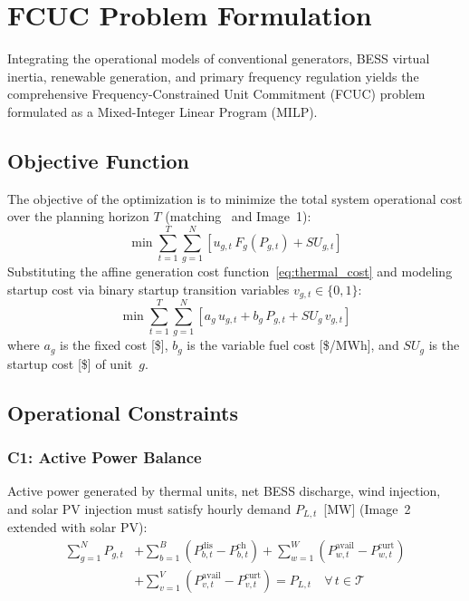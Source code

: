 \documentclass[journal]{IEEEtran}
\begin{document}
\section{FCUC Problem Formulation}
\label{sec:formulation}

Integrating the operational models of conventional generators, BESS virtual inertia, renewable generation, and primary frequency regulation yields the comprehensive Frequency-Constrained Unit Commitment (FCUC) problem formulated as a Mixed-Integer Linear Program (MILP).

\subsection{Objective Function}

The objective of the optimization is to minimize the total system operational cost over the planning horizon $T$ (matching~\cite{E02Sulawesi} and Image~1):
\begin{equation}
  \min \sum_{t=1}^{T} \sum_{g=1}^{N} \left[ u_{g,t}\,F_g(P_{g,t}) + SU_{g,t} \right]
  \label{eq:objective_base}
\end{equation}
Substituting the affine generation cost function~\eqref{eq:thermal_cost} and modeling startup cost via binary startup transition variables $v_{g,t} \in \{0, 1\}$:
\begin{equation}
  \min \sum_{t=1}^{T} \sum_{g=1}^{N} \left[ a_g\,u_{g,t} + b_g\,P_{g,t} + SU_g\,v_{g,t} \right]
  \label{eq:objective_full}
\end{equation}
where $a_g$ is the fixed cost [\$], $b_g$ is the variable fuel cost [\$/MWh], and $SU_g$ is the startup cost [\$] of unit~$g$.

\subsection{Operational Constraints}

\subsubsection{C1: Active Power Balance}
Active power generated by thermal units, net BESS discharge, wind injection, and solar PV injection must satisfy hourly demand $P_{L,t}$~[MW] (Image~2 extended with solar PV):
\begin{equation}
  \begin{aligned}
    \sum_{g=1}^{N} P_{g,t}
    &+ \sum_{b=1}^{B} \left( P_{b,t}^{\text{dis}} - P_{b,t}^{\text{ch}} \right)
    + \sum_{w=1}^{W} \left( P_{w,t}^{\text{avail}} - P_{w,t}^{\text{curt}} \right) \\
    &+ \sum_{v=1}^{V} \left( P_{v,t}^{\text{avail}} - P_{v,t}^{\text{curt}} \right)
    = P_{L,t} \quad \forall\,t \in \mathcal{T}
  \end{aligned}
  \label{eq:power_balance}
\end{equation}
\end{document}
